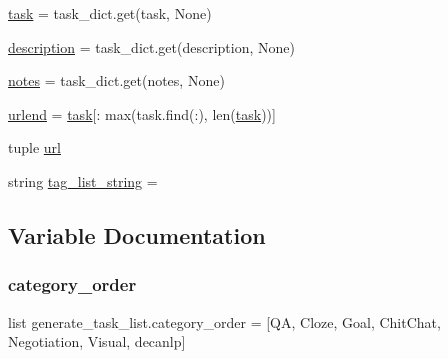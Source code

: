 \begin{DoxyCompactItemize}
\hyperlink{namespacegenerate__task__list_a6a85e730374a68f9195f2e0e4fc09a9a}{task} = task\+\_\+dict.\+get(\textquotesingle{}task\textquotesingle{}, None)
\item 
\hyperlink{namespacegenerate__task__list_af4d07327ee07ddc711991e687bfe3a0a}{description} = task\+\_\+dict.\+get(\textquotesingle{}description\textquotesingle{}, None)
\item 
\hyperlink{namespacegenerate__task__list_a1feaa5a8d61ba81c4e59ce336b9e1a95}{notes} = task\+\_\+dict.\+get(\textquotesingle{}notes\textquotesingle{}, None)
\item 
\hyperlink{namespacegenerate__task__list_a32a1426d61e9e5475d58bdb9db0d22ab}{urlend} = \hyperlink{namespacegenerate__task__list_a6a85e730374a68f9195f2e0e4fc09a9a}{task}\mbox{[}\+: max(task.\+find(\textquotesingle{}\+:\textquotesingle{}), len(\hyperlink{namespacegenerate__task__list_a6a85e730374a68f9195f2e0e4fc09a9a}{task}))\mbox{]}
\item 
tuple \hyperlink{namespacegenerate__task__list_a44c805c529a26ee211795d8c7064facb}{url}
\item 
string \hyperlink{namespacegenerate__task__list_a82101fcc5cd14207589b27749bf3bac2}{tag\+\_\+list\+\_\+string} = \textquotesingle{}\textquotesingle{}
\end{DoxyCompactItemize}


\subsection{Variable Documentation}
\mbox{\label{namespacegenerate__task__list_a7697d682f472185323fda0300e278233}} 
\subsubsection{\texorpdfstring{category\+\_\+order}{category\_order}}
{\footnotesize\ttfamily list generate\+\_\+task\+\_\+list.\+category\+\_\+order = \mbox{[}\textquotesingle{}QA\textquotesingle{}, \textquotesingle{}Cloze\textquotesingle{}, \textquotesingle{}Goal\textquotesingle{}, \textquotesingle{}Chit\+Chat\textquotesingle{}, \textquotesingle{}Negotiation\textquotesingle{}, \textquotesingle{}Visual\textquotesingle{}, \textquotesingle{}decanlp\textquotesingle{}\mbox{]}}



